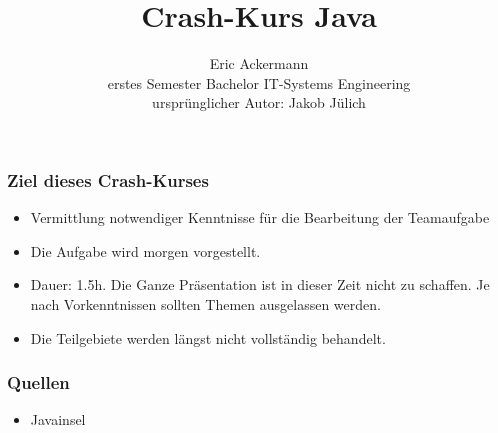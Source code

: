 \documentclass{beamer}
\begin{document}
			
	
	\title[Crash-Kurs Java]{Crash-Kurs Java}
	\author[Eric Ackermann]{Eric Ackermann\\ erstes Semester Bachelor IT-Systems Engineering \\ ursprünglicher Autor: Jakob Jülich}
	
	 \begin{frame}[title=Hauptgebaeude_Nacht.jpg]
	 \maketitle
 	\end{frame}
	 
	\begin{frame}
		\frametitle{Ziel dieses Crash-Kurses}
		\begin{itemize}
			\item Vermittlung notwendiger Kenntnisse für die Bearbeitung der Teamaufgabe
			\item[] Die Aufgabe wird morgen vorgestellt.
			\item Dauer: 1.5h. Die Ganze Präsentation ist in dieser Zeit nicht zu schaffen. Je nach Vorkenntnissen sollten Themen ausgelassen werden.
			\item Die Teilgebiete werden längst nicht vollständig behandelt.
		\end{itemize}
	\end{frame}
		
	
\begin{frame}
		\frametitle{Quellen}
		\begin{itemize}
		  \item Javainsel
		\end{itemize}
	\end{frame}
\end{document}
